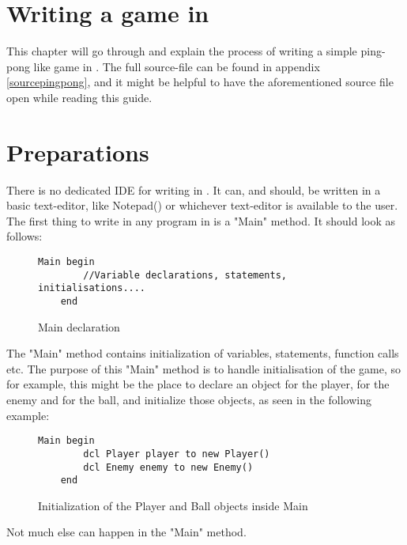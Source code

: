 \section{Writing a game in \lang{}}
This chapter will go through and explain the process of writing a simple ping-pong like game in \lang{}. The full source-file can be found in appendix \ref{sourcepingpong}, and it might be helpful to have the aforementioned source file open while reading this guide. 
\section{Preparations}
There is no dedicated IDE for writing in \lang{}. It can, and should, be written in a basic text-editor, like Notepad(\cite{notepad}) or whichever text-editor is available to the user.\\
The first thing to write in any program in \lang{} is a "Main" method. It should look as follows:
\begin{figure}[H]
    \centering
    \begin{lstlisting}[style=gglang]
    Main begin
        //Variable declarations, statements, initialisations....
    end
    \end{lstlisting}
    \caption{Main declaration}
    \label{fig:maindcl}
\end{figure}
The "Main" method contains initialization of variables, statements, function calls etc. The purpose of this "Main" method is to handle initialisation of the game, so for example, this might be the place to declare an object for the player, for the enemy and for the ball, and initialize those objects, as seen in the following example:
\begin{figure}[H]
    \centering
    \begin{lstlisting}[style=gglang]
    Main begin
        dcl Player player to new Player()
        dcl Enemy enemy to new Enemy()
    end
    \end{lstlisting}
    \caption{Initialization of the Player and Ball objects inside Main}
    \label{fig:maindclinit}
\end{figure}
Not much else can happen in the "Main" method. 

